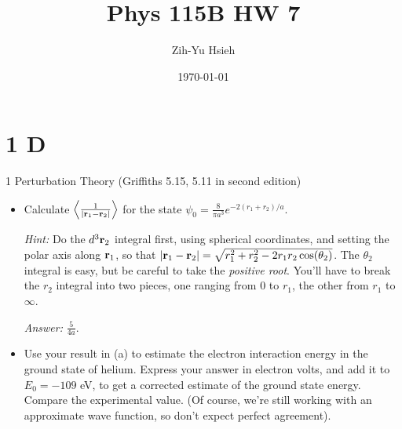 \documentclass{article}
\title{Phys 115B HW 7}
\author{Zih-Yu Hsieh}
\date{\today}
\begin{document}
\maketitle

\section*{1 D}
\begin{ques}
1 Perturbation Theory (Griffiths 5.15, 5.11 in second edition)

\begin{itemize}
    \item[(a)] Calculate $\left<\frac{1}{|\mathbf{r}_1-\mathbf{r}_2|}\right>$ for the state $\psi_0 = \frac{8}{\pi a^3}e^{-2(r_1+r_2)/a}$.
    
    \emph{Hint:} Do the $d^3\mathbf{r}_2$ integral first, using spherical coordinates, and setting the polar axis along $\mathbf{r}_1$, so that $|\mathbf{r}_1-\mathbf{r}_2| = \sqrt{r_1^2+r_2^2-2r_1r_2\cos(\theta_2)}$. The $\theta_2$ integral is easy, but be careful to take the \emph{positive root}. You'll have to break the $r_2$ integral into two pieces, one ranging from $0$ to $r_1$, the other from $r_1$ to $\infty$. 

    \emph{Answer:} $\frac{5}{4a}$.

    \item[(b)] Use your result in (a) to estimate the electron interaction energy in the ground state of helium. Express your answer in electron volts, and add it to $E_0 = -109$ eV, to get a corrected estimate of the ground state energy. Compare the experimental value. (Of course, we're still working with an approximate wave function, so don't expect perfect agreement).
\end{itemize}
\end{ques}
\end{document}

